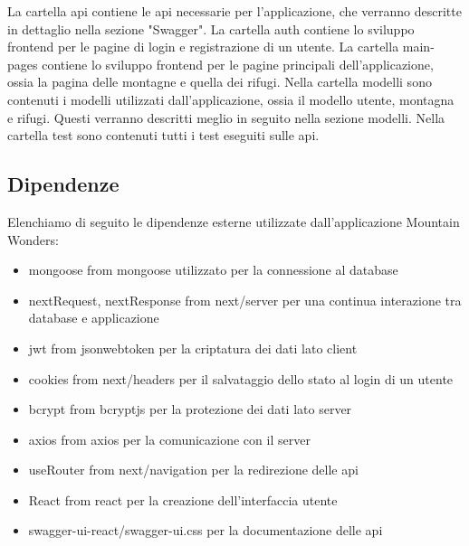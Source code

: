 \documentclass[a4paper,12pt]{article}
\begin{document}
La cartella api contiene le api necessarie per l'applicazione, che verranno descritte in dettaglio nella sezione "Swagger".
\newline
La cartella auth contiene lo sviluppo frontend per le pagine di login e registrazione di un utente.
\newline
La cartella main-pages contiene lo sviluppo frontend per le pagine principali dell'applicazione, ossia la pagina delle montagne e quella dei rifugi.
\newline
Nella cartella modelli sono contenuti i modelli utilizzati dall'applicazione, ossia il modello utente, montagna e rifugi. Questi verranno descritti meglio in seguito nella sezione modelli. \newline
Nella cartella test sono contenuti tutti i test eseguiti sulle api.

\subsection{Dipendenze}
Elenchiamo di seguito le dipendenze esterne utilizzate dall'applicazione Mountain Wonders:
\begin{itemize}
    \item mongoose from mongoose utilizzato per la connessione al database
    \item nextRequest, nextResponse from next/server per una continua interazione tra database e applicazione
    \item jwt from jsonwebtoken per la criptatura dei dati lato client
    \item cookies from next/headers per il salvataggio dello stato al login di un utente
    \item bcrypt from bcryptjs per la protezione dei dati lato server 
    \item axios from axios per la comunicazione con il server
    \item useRouter from next/navigation per la redirezione delle api
    \item React from react per la creazione dell'interfaccia utente
    \item swagger-ui-react/swagger-ui.css per la documentazione delle api
\end{itemize}













\newpage
\end{document}
